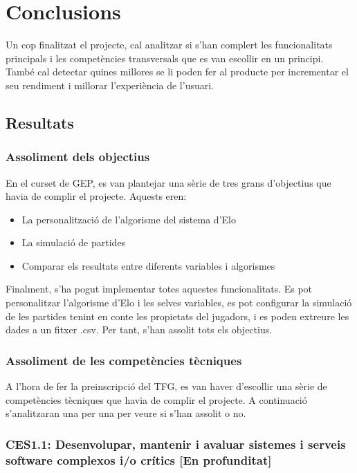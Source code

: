 \documentclass[a4paper]{article}
\begin{document}
\newpage
\section{Conclusions}

Un cop finalitzat el projecte, cal analitzar si s'han complert les funcionalitats principals i les competències transversals que es van escollir en un principi. També cal detectar quines millores se li poden fer al producte per incrementar el seu rendiment i millorar l'experiència de l'usuari.

\subsection{Resultats}

\subsubsection{Assoliment dels objectius}
En el curset de GEP, es van plantejar una sèrie de tres grans d'objectius que havia de complir el projecte. Aquests eren:

\begin{itemize}
    \item La personalització de l'algorisme del sistema d'Elo
    \item La simulació de partides
    \item Comparar els resultats entre diferents variables i algorismes
\end{itemize}   

Finalment, s'ha pogut implementar totes aquestes funcionalitats. Es pot personalitzar l'algorisme d'Elo i les selves variables, es pot configurar la simulació de les partides tenint en conte les propietats del jugadors, i es poden extreure les dades a un fitxer .csv. Per tant, s'han assolit tots els objectius.

\subsubsection{Assoliment de les competències tècniques}

A l'hora de fer la preinscripció del TFG, es van haver d'escollir una sèrie de competències tècniques que havia de complir el projecte. A continuació s'analitzaran una per una per veure si s'han assolit o no.

\subsubsection*{CES1.1: Desenvolupar, mantenir i avaluar sistemes i serveis software complexos i/o crítics [En profunditat]}
\end{document}
